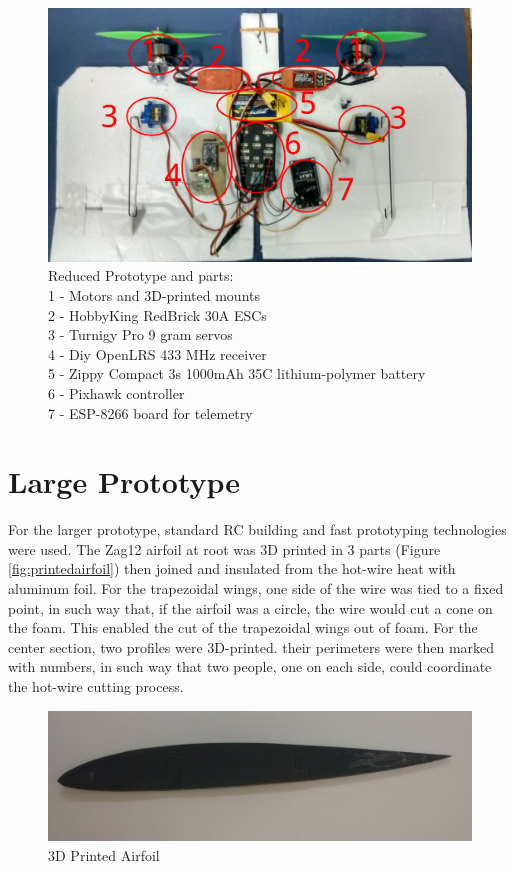 \begin{figure}[H]
\centering
  \includegraphics[width=\linewidth]{figs/reducedprototype.jpg}
  \caption{Reduced Prototype and parts:\\
   1 - Motors and 3D-printed mounts\\
   2 - HobbyKing RedBrick 30A ESCs\\
   3 - Turnigy Pro 9 gram servos\\
   4 - Diy OpenLRS 433 MHz receiver\\
   5 - Zippy Compact 3s 1000mAh 35C lithium-polymer battery\\
   6 - Pixhawk controller\\
   7 - ESP-8266 board for telemetry}
  \label{ffig:smallprotorypeparts}
\end{figure}

\section{Large Prototype}

For the larger prototype, standard RC building and fast prototyping technologies were used.
The Zag12 airfoil at root was 3D printed in 3 parts (Figure \ref{fig:printedairfoil}) then joined and insulated from the hot-wire heat with aluminum foil. For the trapezoidal wings, one side of the wire was tied to a fixed point, in such way that, if the airfoil was a circle, the wire would cut a cone on the foam. This enabled the cut of the trapezoidal wings out of foam. For the center section, two profiles were 3D-printed. their perimeters were then marked with numbers, in such way that two people, one on each side, could coordinate the hot-wire cutting process.

\begin{figure}[H]
\centering
  \includegraphics[width=\linewidth]{figs/printedairfoil.png}
  \caption{3D Printed Airfoil}
  \label{ffig:printedairfoil}
\end{figure}



